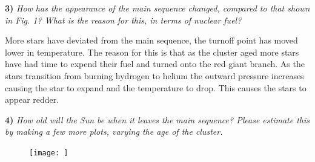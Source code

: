 \documentclass[11pt,a4paper]{article}
\begin{document}
    \textbf{3)} \textit{How has the appearance of the main sequence changed, compared to that shown in Fig. 1?
    What is the reason for this, in terms of nuclear fuel?}

    More stars have deviated from the main sequence, the turnoff point has moved lower in temperature.
    The reason for this is that as the cluster aged more stars have had time to expend their fuel and turned onto the red giant branch.
    As the stars transition from burning hydrogen to helium the outward pressure increases causing the star to expand and the temperature to drop.
    This causes the stars to appear redder.

    \textbf{4)} \textit{How old will the Sun be when it leaves the main sequence?
    Please estimate this by making a few more plots, varying the age of the cluster.}

    \begin{figure}
        \centering
        \texttt{[image: ]}
    \end{figure}
\end{document}
